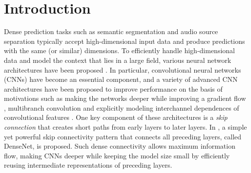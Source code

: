 \documentclass[final]{cvpr}
\begin{document}
\section{Introduction}
\label{sec:intro}
Dense prediction tasks such as semantic segmentation and audio source separation typically accept high-dimensional input data and produce predictions with the same (or similar) dimensions.
To efficiently handle high-dimensional data and model the context that lies in a large field, various neural network architectures have been proposed \cite{Long15,SunXLW19,WangSCJDZLMTWLX19,Takahashi17}.
In particular, convolutional neural networks (CNNs) have become an essential component, and a variety of advanced CNN architectures have been proposed to improve performance on the basis of motivations such as making the networks deeper while improving a gradient flow \cite{He16ResNet,Huang17Densenet,Larsson17}, multibranch convolution \cite{Szegedy15, Szegedy16} and explicitly modeling interchannel dependences of convolutional features \cite{Hu18SEnet}. One key component of these architectures is a \textit{skip connection} that creates short paths from early layers to later layers. In \cite{Huang17Densenet}, a simple yet powerful skip connectivity pattern that connects all preceding layers, called DenseNet, is proposed. Such dense connectivity allows maximum information flow, making CNNs deeper while keeping the model size small by efficiently reusing intermediate representations of preceding layers.
\end{document}
